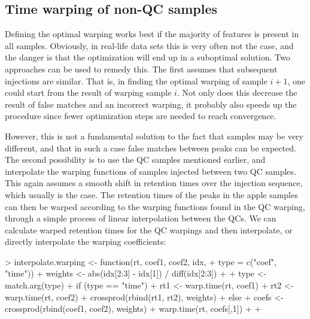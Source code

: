 \documentclass[a4paper,11pt]{article}
\begin{document}
\subsection{Time warping of non-QC samples}
Defining the optimal warping works best if the majority of features is
present in all samples. Obviously, in real-life data sets this is very
often not the case, and the danger is that the optimization will end
up in a suboptimal solution. Two approaches can be used to remedy
this. The first assumes that subsequent injections are similar. That
is, in finding the optimal warping of sample $i+1$, one could start
from the result of warping sample $i$. Not only does this decrease the
result of false matches and an incorrect warping, it probably also
speeds up the procedure since fewer optimization steps are needed to
reach convergence.

However, this is not a fundamental solution to the fact that samples
may be very different, and that in such a case false matches between
peaks can be expected. The second possibility is to use the QC samples
mentioned earlier, and interpolate the warping functions of samples
injected between two QC samples. This again assumes a smooth shift in
retention times over the injection sequence, which usually is the case.
The retention times of the peaks in the apple samples can then be
warped according to the warping functions found in the QC warping,
through a simple process of linear interpolation between the QCs. We
can calculate warped retention times for the QC warpings and then
interpolate, or directly interpolate the warping coefficients:
\begin{Schunk}
\begin{Sinput}
> interpolate.warping <- function(rt, coef1, coef2, idx, 
+                                 type = c("coef", "time")) { 
+   weights <- abs(idx[2:3] - idx[1]) / diff(idx[2:3])
+   
+   type <- match.arg(type)
+   if (type == "time") {
+     rt1 <- warp.time(rt, coef1)
+     rt2 <- warp.time(rt, coef2)
+     crossprod(rbind(rt1, rt2), weights)
+   } else {
+     coefs <- crossprod(rbind(coef1, coef2), weights)
+     warp.time(rt, coefs[,1])
+   }
+ }
\end{Sinput}
\end{Schunk}
\end{document}
